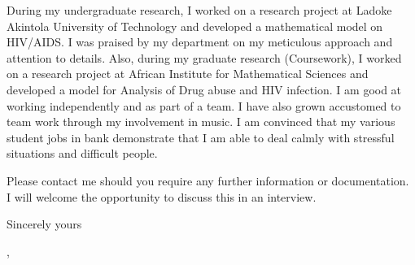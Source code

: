 \documentclass{letter} %
\begin{document}
\noindent During my undergraduate research, I worked on a research project at Ladoke Akintola University of Technology and developed a mathematical model on HIV/AIDS. I was praised by my department on my meticulous approach and attention to details. Also, during my graduate research (Coursework), I worked on a research project at African Institute for Mathematical Sciences and developed a model for Analysis of Drug abuse and HIV infection. I am good at working independently and as part of a team. I have also grown accustomed to team work through my involvement in  music. I am convinced that my various student jobs in bank demonstrate that I am able to deal calmly with stressful situations and difficult people.

Please contact me should you require any further information or documentation.
I will welcome the opportunity to discuss this in an interview.
\closing{Sincerely yours},
\end{document}
